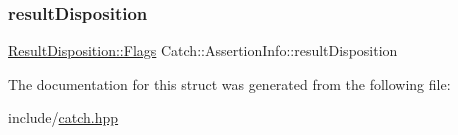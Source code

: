\subsubsection{\texorpdfstring{result\+Disposition}{resultDisposition}}
{\footnotesize\ttfamily \mbox{\hyperlink{struct_catch_1_1_result_disposition_a3396cad6e2259af326b3aae93e23e9d8}{Result\+Disposition\+::\+Flags}} Catch\+::\+Assertion\+Info\+::result\+Disposition}



The documentation for this struct was generated from the following file\+:\begin{DoxyCompactItemize}
\item 
include/\mbox{\hyperlink{catch_8hpp}{catch.\+hpp}}\end{DoxyCompactItemize}
